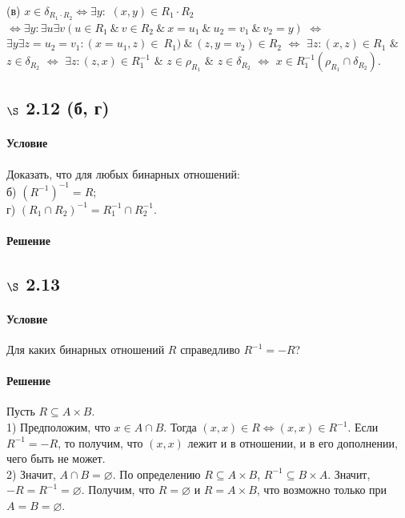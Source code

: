 \documentclass[a4paper,12pt]{article}
\begin{document}
\bigskip

(в) $x\in \delta_{R_1\cdot R_2} \Leftrightarrow \exists y:$ $(x,y)\in R_1\cdot R_2$
 $\Leftrightarrow \exists y: \exists u \exists v (u\in R_1 \ \& \ v\in R_2 \ \& \ x=u_1 \ \& \ u_2 = v_1 \ \& \ v_2 = y)$ $\Leftrightarrow$ $\exists y \exists z=u_2=v_1: (x=u_1,z)\in~R_1) \ \& \ (z,y=v_2)\in R_2$ $\Leftrightarrow$ $\exists z: (x,z)\in R_1$ $\&$ $z\in \delta_{R_2}$ $\Leftrightarrow$ $\exists z: (z,x)\in R_1^{-1}$ $\&$ $z\in \rho_{R_1}$ $\&$ $z\in \delta_{R_2}$ $\Leftrightarrow$ $x\in R_1^{-1} (\rho_{R_1} \cap \delta_{R_2})$.
 
\subsection*{$\S$ 2.12 (б, г)}
\paragraph*{Условие}
Доказать, что для любых бинарных отношений:\\
б) $(R^{-1})^{-1} = R$; \\
г) $(R_1 \cap R_2)^{-1} = R_1^{-1} \cap R_2^{-1}$.
\paragraph*{Решение}

\subsection*{$\S$ 2.13}
\paragraph*{Условие}
Для каких бинарных отношений $R$ справедливо $R^{-1} = -R$?
\paragraph*{Решение}
Пусть $R \subseteq A\times B$. \\
1) Предположим, что $x\in A \cap B$. Тогда $(x,x) \in R \Leftrightarrow (x,x) \in R^{-1}$. Если $R^{-1} = -R$, то получим, что $(x,x)$ лежит и в отношении, и в его дополнении, чего быть не может.\\
2) Значит, $A \cap B=\varnothing$. По определению $R \subseteq A\times B$, $R^{-1} \subseteq B\times A$. Значит, $-R=R^{-1}=\varnothing$. Получим, что $R=\varnothing$ и $R=A\times B$, что возможно только при $A=B=\varnothing$.
\end{document}
